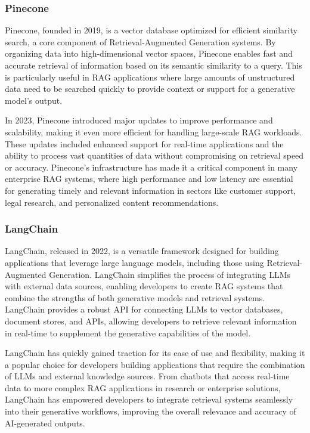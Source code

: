 \subsubsection{Pinecone}

Pinecone, founded in 2019, is a vector database optimized for efficient similarity search, a core component of Retrieval-Augmented Generation systems. 
By organizing data into high-dimensional vector spaces, Pinecone enables fast and accurate retrieval of information based on its semantic similarity to a query. 
This is particularly useful in RAG applications where large amounts of unstructured data need to be searched quickly to provide context or support for a generative model’s output.

In 2023, Pinecone introduced major updates to improve performance and scalability, making it even more efficient for handling large-scale RAG workloads. 
These updates included enhanced support for real-time applications and the ability to process vast quantities of data without compromising on retrieval speed or accuracy. 
Pinecone’s infrastructure has made it a critical component in many enterprise RAG systems, where high performance and low latency are essential for generating timely and relevant information in sectors like customer support, legal research, and personalized content recommendations.

\subsubsection{LangChain}

LangChain, released in 2022, is a versatile framework designed for building applications that leverage large language models, including those using Retrieval-Augmented Generation. 
LangChain simplifies the process of integrating LLMs with external data sources, enabling developers to create RAG systems that combine the strengths of both generative models and retrieval systems. 
LangChain provides a robust API for connecting LLMs to vector databases, document stores, and APIs, allowing developers to retrieve relevant information in real-time to supplement the generative capabilities of the model.

LangChain has quickly gained traction for its ease of use and flexibility, making it a popular choice for developers building applications that require the combination of LLMs and external knowledge sources. 
From chatbots that access real-time data to more complex RAG applications in research or enterprise solutions, LangChain has empowered developers to integrate retrieval systems seamlessly into their generative workflows, improving the overall relevance and accuracy of AI-generated outputs.

